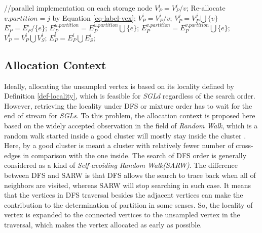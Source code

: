 \documentclass{sig-alternate-2013}
\begin{document}
\begin{algorithm}[!htbp]
\begin{algorithmic}[1]
\STATE //parallel implementation on each storage node
            \STATE $V_P^i=V_P^i/v$; \label {alg-sgl-stream-clean-storage-node}
        \ELSE
             \label{alg-sgl-stream-ac-change-begin}
                \STATE Re-allocate $v.partition = j$ by Equation \ref{eq-label-vex};
                \STATE $V_P^i = V_P^i/v$; $V_P^j=V_P^j\bigcup \{v\}$
            \ENDIF \label{alg-sgl-stream-ac-change-end}
        \ENDIF
    \ENDFOR
     \label{alg-sgl-stream-fix-EP-begin}
            \STATE $E_P^i=E_P^i/\{e\}$;
            \STATE $E_P^{u.partition}=E_P^{u.partition}\bigcup\{e\}$;
            \STATE $E_P^{v.partition}=E_P^{v.partition}\bigcup\{e\}$;
        \ENDIF
    \ENDFOR
    \STATE $V_P^i=V_P^i\bigcup V_S^i$; $E_P^i=E_P^i\bigcup E_S^i$; \label{alg-sgl-stream-fix-EP-end}
\ENDFOR
\end{algorithmic}
\end{algorithm}

\subsection {Allocation Context}\label{ch-sgls-ac}

Ideally, allocating the unsampled vertex is based on its locality defined by Definition \ref{def-locality}, which is feasible for \textit{SGLd} regardless of the search order. However, retrieving the locality under DFS or mixture order has to wait for the end of stream for \textit{SGLs}.
To this problem, the allocation context is proposed here based on the widely accepted observation in the field of \textit{Random Walk}, which is a random walk started inside a good cluster will mostly stay inside the cluster \cite{DBLP:books/sp/social11}. Here, by a good cluster is meant a cluster with relatively fewer number of cross-edges in comparison with the one inside.
The search of DFS order is generally considered as a kind of \textit{Self-avoiding Random Walk(SARW)}. The difference between DFS and SARW is that DFS allows the search to trace back when all of neighbors are visited, whereas SARW will stop searching in such case. It means that the vertices in DFS traversal besides the adjacent vertices can make the contribution to the determination of partition in some senses. So, the locality of vertex is expanded to the connected vertices to the unsampled vertex in the traversal, which makes the vertex allocated as early as possible.
\end{document}
